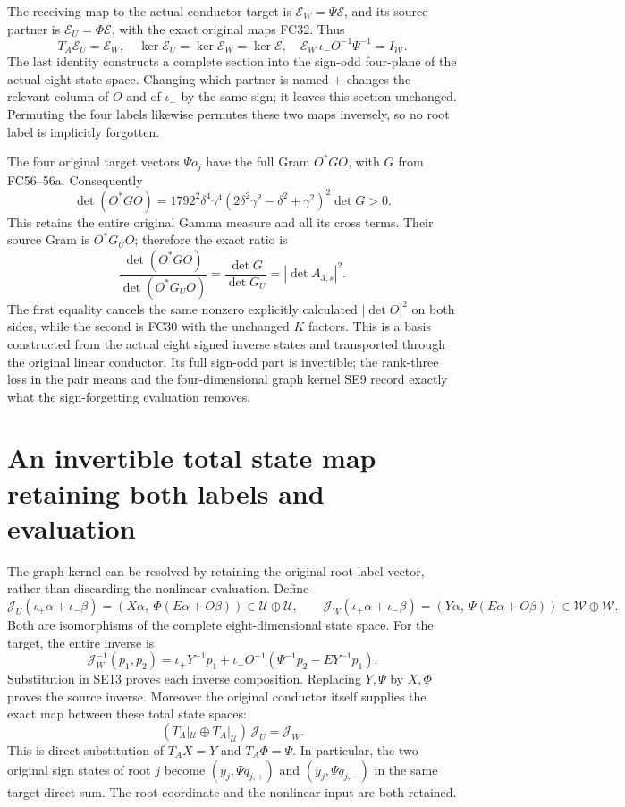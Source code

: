 \documentclass[11pt]{article}
\begin{document}
The receiving map to the actual conductor target is
$\mathcal E_W=\Psi\mathcal E$, and its source partner is
$\mathcal E_U=\Phi\mathcal E$, with the exact original maps FC32.
Thus
\[
 T_A\mathcal E_U=\mathcal E_W,\quad
 \ker\mathcal E_U=\ker\mathcal E_W=\ker\mathcal E,\quad
 \mathcal E_W\,\iota_-O^{-1}\Psi^{-1}=I_{\mathcal W}.
 \tag{SE10}
\]
The last identity constructs a complete section into the sign-odd
four-plane of the actual eight-state space. Changing which partner
is named $+$ changes the relevant column of $O$ and of $\iota_-$
by the same sign; it leaves this section unchanged. Permuting the
four labels likewise permutes these two maps inversely, so no root
label is implicitly forgotten.

The four original target vectors $\Psi o_j$ have the full Gram
$O^*GO$, with $G$ from FC56--56a. Consequently
\[
 \det(O^*GO)=1792^2\delta^4\gamma^4
       (2\delta^2\gamma^2-\delta^2+\gamma^2)^2\det G>0.
 \tag{SE11}
\]
This retains the entire original Gamma measure and all its cross
terms. Their source Gram is $O^*G_UO$; therefore the exact ratio is
\[
 \frac{\det(O^*GO)}{\det(O^*G_UO)}
 =\frac{\det G}{\det G_U}=|\det A_{3,s}|^2.
 \tag{SE12}
\]
The first equality cancels the same nonzero explicitly calculated
$|\det O|^2$ on both sides, while the second is FC30 with the
unchanged $K$ factors. This is a basis constructed from the actual
eight signed inverse states and transported through the original
linear conductor. Its full sign-odd part is invertible; the rank-three
loss in the pair means and the four-dimensional graph kernel SE9
record exactly what the sign-forgetting evaluation removes.

\section{An invertible total state map retaining both labels and evaluation}
The graph kernel can be resolved by retaining the original root-label
vector, rather than discarding the nonlinear evaluation. Define
\[
 \mathcal J_U(\iota_+\alpha+\iota_-\beta)
       =(X\alpha,\ \Phi(E\alpha+O\beta))\in\mathcal U\oplus\mathcal U,
 \qquad
 \mathcal J_W(\iota_+\alpha+\iota_-\beta)
       =(Y\alpha,\ \Psi(E\alpha+O\beta))\in\mathcal W\oplus\mathcal W.
 \tag{SE13}
\]
Both are isomorphisms of the complete eight-dimensional state space.
For the target, the entire inverse is
\[
 \mathcal J_W^{-1}(p_1,p_2)=
 \iota_+Y^{-1}p_1+
 \iota_-O^{-1}(\Psi^{-1}p_2-EY^{-1}p_1).
 \tag{SE14}
\]
Substitution in SE13 proves each inverse composition. Replacing
$Y,\Psi$ by $X,\Phi$ proves the source inverse. Moreover the
original conductor itself supplies the exact map between these
total state spaces:
\[
 (T_A|_{\mathcal U}\oplus T_A|_{\mathcal U})\,\mathcal J_U
      =\mathcal J_W.
 \tag{SE15}
\]
This is direct substitution of $T_AX=Y$ and $T_A\Phi=\Psi$.
In particular, the two original sign states of root $j$ become
$(y_j,\Psi q_{j,+})$ and $(y_j,\Psi q_{j,-})$ in the same
target direct sum. The root coordinate and the nonlinear input
are both retained.
\end{document}

